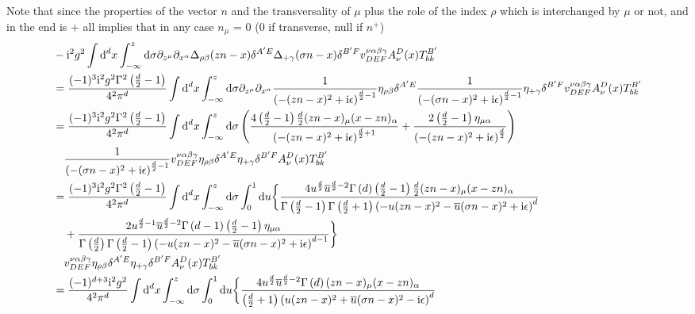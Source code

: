 Note that since the properties of the vector $n$ and the transversality of $\mu$ plus the role of the index $\rho$ which is interchanged by $\mu$ or not, and in the end is $+$ all implies that in any case $n_\mu$ = 0 (0 if transverse, null if $n^+$)
\begin{align}
	&- \imag ^2 g^2 \int \ddx x \int _{-\infty}^{z} \dx \sigma  \partial_{z^\mu} \partial_{x^\alpha} \propagator_{\rho \beta}(zn-x) \delta^{A'E} \propagator_{+ \gamma}(\sigma n-x) \delta^{B'F}v^{\nu \alpha\beta\gamma}_{DEF}A_\nu^D(x)T_{bk}^{B'}
	\\
	&=
	\frac{(-1)^3 \imag ^2 g^2\Gamma^2\left(\frac{d}{2}-1\right)}{4^2\pi^d} \int \ddx x \int _{-\infty}^{z} \dx \sigma  \partial_{z^\mu} \partial_{x^\alpha} \frac{1}{\left(-(zn-x)^2+\imag \epsilon\right)^{\frac{d}{2}-1}} \metric_{\rho \beta} \delta^{A'E} \frac{1}{\left(-(\sigma n-x)^2+\imag \epsilon\right)^{\frac{d}{2}-1}}\metric_{+ \gamma}\delta^{B'F} v^{\nu \alpha\beta\gamma}_{DEF}A_\nu^D(x)T_{bk}^{B'}
	\\
	&=
	\frac{(-1)^3 \imag ^2 g^2\Gamma^2\left(\frac{d}{2}-1\right)}{4^2\pi^d} \int \ddx x \int _{-\infty}^{z} \dx \sigma  \left( \frac{4\left(\frac{d}{2}-1\right)\frac{d}{2}(zn-x)_\mu(x-zn)_\alpha}{\left(-(zn-x)^2+\imag \epsilon\right)^{\frac{d}{2}+1} } +\frac{2\left(\frac{d}{2}-1\right) \metric_{\mu \alpha}}{\left(-(zn-x)^2+\imag \epsilon\right)^{\frac{d}{2}}}\right)  
	\nl 
	\frac{1}{\left(-(\sigma n-x)^2+\imag \epsilon\right)^{\frac{d}{2}-1}} v^{\nu \alpha\beta\gamma}_{DEF}\metric_{\rho \beta} \delta^{A'E}\metric_{+ \gamma}\delta^{B'F}A_\nu^D(x)T_{bk}^{B'}
	\\
	&=
	\frac{(-1)^3 \imag ^2 g^2\Gamma^2\left(\frac{d}{2}-1\right)}{4^2\pi^d} \int \ddx x \int _{-\infty}^{z} \dx \sigma \int_0^1 \dx u \bigg\{ \frac{4   u^{\frac{d}{2}} \overline u^{\frac{d}{2}-2} \Gamma\left(d\right)\left(\frac{d}{2}-1\right)\frac{d}{2}(zn-x)_\mu(x-zn)_\alpha}{\Gamma\left(\frac{d}{2}-1\right)\Gamma\left(\frac{d}{2}+1\right)\left(-u(zn-x)^2-\overline u(\sigma n -x)^2+\imag \epsilon\right)^{d} } 
	\nl
	+ \frac{2u^{\frac{d}{2}-1} \overline u ^{\frac{d}{2}-2}\Gamma\left(d-1\right)\left(\frac{d}{2}-1\right) \metric_{\mu \alpha}}{\Gamma\left( \frac{d}{2} \right)\Gamma\left( \frac{d}{2}-1 \right)\left(-u(zn-x)^2-\overline u (\sigma n-x)^2+\imag \epsilon\right)^{d-1}}\bigg\}  
	\nl 
	v^{\nu \alpha\beta\gamma}_{DEF}\metric_{\rho \beta} \delta^{A'E}\metric_{+ \gamma}\delta^{B'F}A_\nu^D(x)T_{bk}^{B'}
	\\
	&=
	\frac{(-1)^{d+3} \imag ^2 g^2}{4^2\pi^d} \int \ddx x \int _{-\infty}^{z} \dx \sigma \int_0^1 \dx u \bigg\{ \frac{4   u^{\frac{d}{2}} \overline u^{\frac{d}{2}-2} \Gamma\left(d\right)(zn-x)_\mu(x-zn)_\alpha}{\left(\frac{d}{2}+1\right)\left(u(zn-x)^2+\overline u(\sigma n -x)^2-\imag \epsilon\right)^{d} } 

\end{align}

